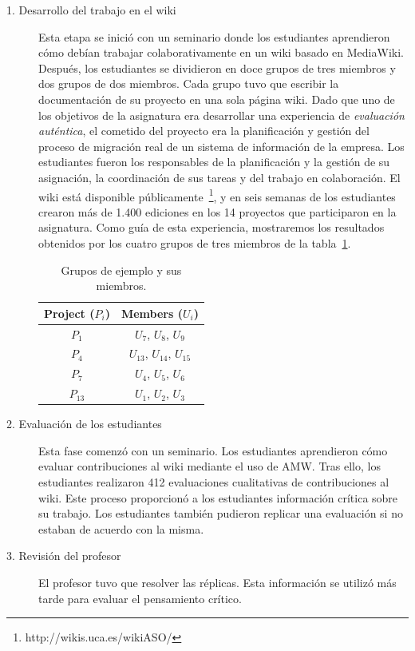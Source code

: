 \begin{description}
\item[1. Desarrollo del trabajo en el wiki]

Esta etapa se inició con un seminario donde los estudiantes aprendieron cómo debían trabajar colaborativamente en un wiki basado en MediaWiki. Después, los estudiantes se dividieron en doce grupos de tres miembros y dos grupos de dos miembros. Cada grupo tuvo que escribir la documentación de su proyecto en una sola página wiki. Dado que uno de los objetivos de la asignatura era desarrollar una experiencia de \emph{evaluación auténtica}, el cometido del proyecto era la planificación y gestión del proceso de migración real de un sistema de información de la empresa. Los estudiantes fueron los responsables de la planificación y la gestión de su asignación, la coordinación de sus tareas y del trabajo en colaboración. El wiki está disponible públicamente~\footnote{http://wikis.uca.es/wikiASO/}, y en seis semanas de los estudiantes crearon más de 1.400 ediciones en los 14 proyectos que participaron en la asignatura. Como guía de esta experiencia, mostraremos los resultados obtenidos por los cuatro grupos de tres miembros de la tabla~\ref {tab:AmwGroupsMembers}.

\begin{table}[h]
\centering
\begin{tabular}{|c|c|}
\hline
\textbf{Project ($P_i$)} & \textbf{Members ($U_i$)}   \\ \hline
\hline
 $P_1$ & $U_7$, $U_8$, $U_9$  \\ \hline
 $P_4$ & $U_{13}$, $U_{14}$, $U_{15}$  \\ \hline
 $P_7$ & $U_4$, $U_5$, $U_6$  \\ \hline
 $P_{13}$ & $U_1$, $U_2$, $U_3$  \\ \hline
\end{tabular}
\caption{Grupos de ejemplo y sus miembros.}
\label{tab:AmwGroupsMembers}
\end{table}

\item[2. Evaluación de los estudiantes]

Esta fase comenzó con un seminario. Los estudiantes aprendieron cómo evaluar contribuciones al wiki mediante el uso de AMW. Tras ello, los estudiantes realizaron 412 evaluaciones cualitativas de contribuciones al wiki. Este proceso proporcionó a los estudiantes información crítica sobre su trabajo. Los estudiantes también pudieron replicar una evaluación si no estaban de acuerdo con la misma.

\item[3. Revisión del profesor]

El profesor tuvo que resolver las réplicas. Esta información se utilizó más tarde para evaluar el pensamiento crítico.

\end{description}


